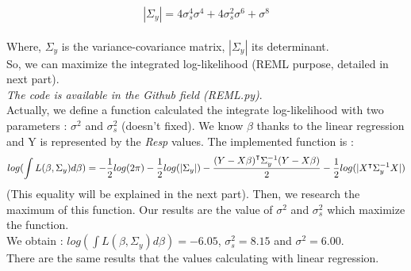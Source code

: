 \documentclass{article}
\begin{document}
\[|\Sigma_y| = 4\sigma_s^4\sigma^4+4\sigma_s^2\sigma^6+\sigma^8\]
\\
Where, $\Sigma_y$ is the variance-covariance matrix, $|\Sigma_y|$ its determinant.\\
So, we can maximize the integrated log-likelihood (REML purpose, detailed in next part).\\
\textit{The code is available in the Github field (REML.py)}.\\
Actually, we define a function calculated the integrate log-likelihood with two parameters : $\sigma^2$ and $\sigma_s^2$ (doesn't fixed). We know $\beta$ thanks to the linear regression and Y is represented by the \textit{Resp} values. The implemented function is :
\[ log(\int L(\beta, \Sigma_y)d\beta)=-\frac{1}{2}log(2\pi)-\frac{1}{2}log(|\Sigma_y|)-\frac{{(Y-X\beta)}^\intercal\Sigma_y^{-1}(Y-X\beta)}{2}-\frac{1}{2}log(|{X}^\intercal\Sigma_y^{-1}X|)\] 
(This equality will be explained in the next part). Then, we research the maximum of this function. Our results are the value of $\sigma^2$ and $\sigma_s^2$ which maximize the function.\\
We obtain : $log(\int L(\beta, \Sigma_y)d\beta)=-6.05$, $\sigma_s^2 = 8.15$ and $\sigma^2=6.00$. \\
There are the same results that the values calculating with linear regression.

\end{document}

